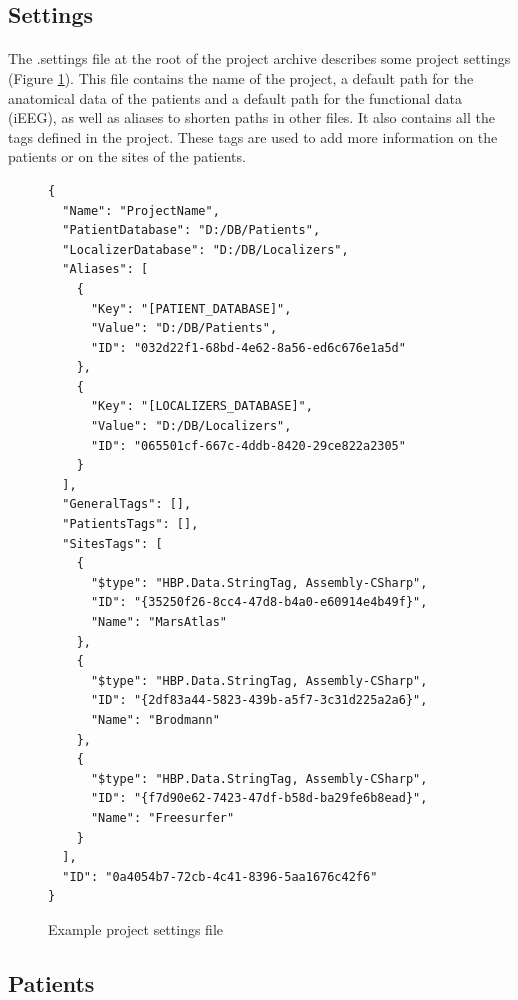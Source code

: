 \documentclass[a4paper]{article}
\begin{document}
\subsection{Settings}
\paragraph{} The .settings file at the root of the project archive describes some project settings (Figure \ref{projectSettings}). This file contains the name of the project, a default path for the anatomical data of the patients and a default path for the functional data (iEEG), as well as aliases to shorten paths in other files. It also contains all the tags defined in the project. These tags are used to add more information on the patients or on the sites of the patients.
\begin{figure}[H]
\begin{lstlisting}
{
  "Name": "ProjectName",
  "PatientDatabase": "D:/DB/Patients",
  "LocalizerDatabase": "D:/DB/Localizers",
  "Aliases": [
    {
      "Key": "[PATIENT_DATABASE]",
      "Value": "D:/DB/Patients",
      "ID": "032d22f1-68bd-4e62-8a56-ed6c676e1a5d"
    },
    {
      "Key": "[LOCALIZERS_DATABASE]",
      "Value": "D:/DB/Localizers",
      "ID": "065501cf-667c-4ddb-8420-29ce822a2305"
    }
  ],
  "GeneralTags": [],
  "PatientsTags": [],
  "SitesTags": [
    {
      "$type": "HBP.Data.StringTag, Assembly-CSharp",
      "ID": "{35250f26-8cc4-47d8-b4a0-e60914e4b49f}",
      "Name": "MarsAtlas"
    },
    {
      "$type": "HBP.Data.StringTag, Assembly-CSharp",
      "ID": "{2df83a44-5823-439b-a5f7-3c31d225a2a6}",
      "Name": "Brodmann"
    },
    {
      "$type": "HBP.Data.StringTag, Assembly-CSharp",
      "ID": "{f7d90e62-7423-47df-b58d-ba29fe6b8ead}",
      "Name": "Freesurfer"
    }
  ],
  "ID": "0a4054b7-72cb-4c41-8396-5aa1676c42f6"
}
\end{lstlisting}
\caption{\label{projectSettings}Example project settings file}
\end{figure}
\subsection{Patients}
\end{document}
